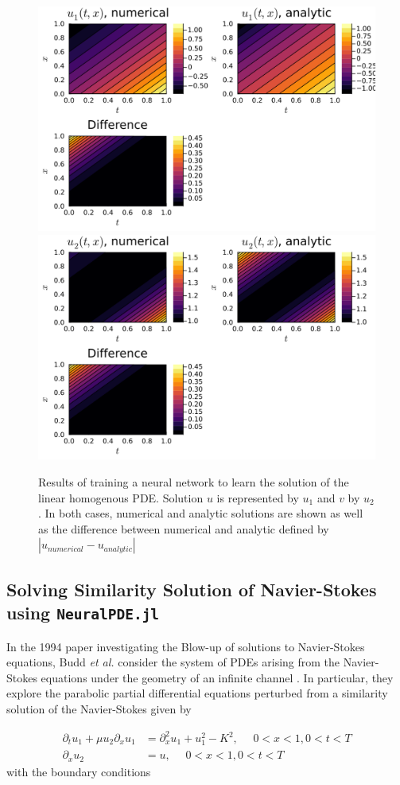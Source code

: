 \documentclass{CUP-JNL-DTM}%
\theoremstyle{definition}
\numberwithin{equation}{section}
\begin{document}
\begin{figure}
\centering
	\includegraphics[width=0.48\linewidth]{figures/linear_homo_PDE_plots/solution_1.png}
	\includegraphics[width=0.48\linewidth]{figures/linear_homo_PDE_plots/solution_2.png}
	\caption{Results of training a neural network to learn the solution of the linear homogenous PDE. Solution $u$ is represented by $u_1$ and $v$ by $u_2$. In both cases, numerical and analytic solutions are shown as well as the difference between numerical and analytic defined by $|u_{numerical} - u_{analytic}|$}
	\label{fig:results_linear}
\end{figure}

\subsection{Solving Similarity Solution of Navier-Stokes using \texttt{NeuralPDE.jl}}

In the 1994 paper investigating the Blow-up of solutions to Navier-Stokes equations, Budd \textit{et al.} consider the system of PDEs arising from the Navier-Stokes equations under the geometry of an infinite channel \cite{buddBlowupSystemPartial1994}. In particular, they explore the parabolic partial differential equations perturbed from a similarity solution of the Navier-Stokes given by

\begin{equation}
\begin{split}
    \partial_t u_1 + \mu u_2 \partial_x u_1 & = \partial^2_{x} u_1 + u_1^2 - K^2, \,\,\,\,\,\,\,\, 0 < x < 1, 0 < t < T \\
    \partial_x u_2 & = u, \,\,\,\,\,\,\,\, 0 < x < 1, 0 < t < T
    \label{eqn:ns_problem}
\end{split}
\end{equation}
with the boundary conditions 
\end{document}
